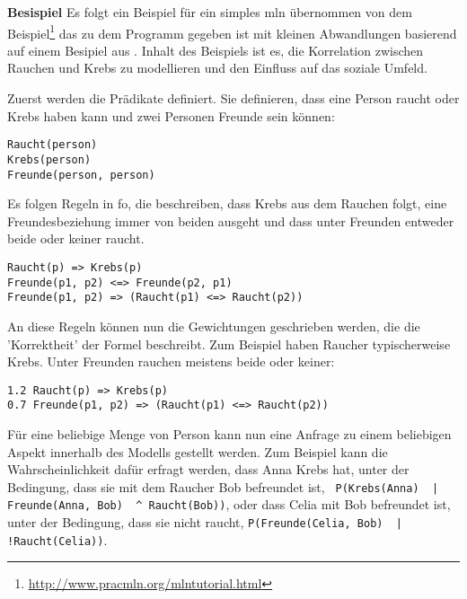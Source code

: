 \textbf{Besispiel} Es folgt ein Beispiel für ein simples \gls{mln} übernommen von dem Beispiel\footnote{\url{http://www.pracmln.org/mlntutorial.html}} das zu dem Programm \pracmln gegeben ist mit kleinen Abwandlungen basierend auf einem Besipiel aus \cite{nyga17}. Inhalt des Beispiels ist es, die Korrelation zwischen Rauchen und Krebs zu modellieren und den Einfluss auf das soziale Umfeld. \par
Zuerst werden die Prädikate definiert. Sie definieren, dass eine Person raucht oder Krebs haben kann und zwei Personen Freunde sein können:
\begin{lstlisting}[backgroundcolor=\color{backcolour}]
Raucht(person)
Krebs(person)
Freunde(person, person)
\end{lstlisting}
Es folgen Regeln in \gls{fo}, die beschreiben, dass Krebs aus dem Rauchen folgt, eine Freundesbeziehung immer von beiden ausgeht und dass unter Freunden entweder beide oder keiner raucht. 
\begin{lstlisting}[backgroundcolor=\color{backcolour}]
Raucht(p) => Krebs(p)
Freunde(p1, p2) <=> Freunde(p2, p1)
Freunde(p1, p2) => (Raucht(p1) <=> Raucht(p2))
\end{lstlisting}
An diese Regeln können nun die Gewichtungen geschrieben werden, die die 'Korrektheit' der Formel beschreibt. Zum Beispiel haben Raucher typischerweise Krebs. Unter Freunden rauchen meistens beide oder keiner:
\begin{lstlisting}[backgroundcolor=\color{backcolour}]
1.2 Raucht(p) => Krebs(p)
0.7 Freunde(p1, p2) => (Raucht(p1) <=> Raucht(p2))
\end{lstlisting}  
Für eine beliebige Menge von Person kann nun eine Anfrage zu einem beliebigen Aspekt innerhalb des Modells  gestellt werden. Zum Beispiel kann die Wahrscheinlichkeit dafür erfragt werden, dass Anna Krebs hat, unter der Bedingung, dass sie mit dem Raucher Bob befreundet ist, \lstinline[breaklines=true]{ P(Krebs(Anna)  | Freunde(Anna, Bob)  ^ Raucht(Bob))}, oder dass Celia mit Bob befreundet ist, unter der Bedingung, dass sie nicht raucht, \lstinline[breaklines=true]{P(Freunde(Celia, Bob)  | !Raucht(Celia))}.


